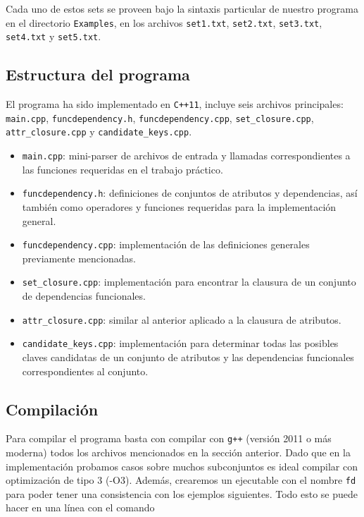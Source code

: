 \documentclass{article}
\begin{document}
Cada uno de estos sets se proveen bajo la sintaxis particular de nuestro programa en el directorio \verb|Examples|, en los archivos \verb|set1.txt|, \verb|set2.txt|, \verb|set3.txt|, \verb|set4.txt| y \verb|set5.txt|.

\subsection{Estructura del programa}
El programa ha sido implementado en \verb|C++11|, incluye seis archivos principales: \verb|main.cpp|, \verb|funcdependency.h|, \verb|funcdependency.cpp|, \verb|set_closure.cpp|, \verb|attr_closure.cpp| y \verb|candidate_keys.cpp|.

\begin{itemize}
    \item \verb|main.cpp|: mini-parser de archivos de entrada y llamadas correspondientes
    a las funciones requeridas en el trabajo práctico.
    \item \verb|funcdependency.h|: definiciones de conjuntos de atributos y dependencias, así también como operadores y funciones requeridas para la implementación general.
    \item \verb|funcdependency.cpp|: implementación de las definiciones generales previamente mencionadas.
    \item \verb|set_closure.cpp|: implementación para encontrar la clausura de un conjunto de dependencias funcionales.
    \item \verb|attr_closure.cpp|: similar al anterior aplicado a la clausura de atributos.
    \item \verb|candidate_keys.cpp|: implementación para determinar todas las posibles claves candidatas de un conjunto de atributos y las dependencias funcionales correspondientes al conjunto.
\end{itemize}

\subsection{Compilación}
Para compilar el programa basta con compilar con \texttt{g++} (versión 2011 o más moderna) todos los archivos mencionados en la sección anterior. Dado que en la implementación probamos casos sobre muchos subconjuntos es ideal compilar con optimización de tipo 3 (-O3). Además, crearemos un ejecutable con el nombre \verb|fd| para poder tener una consistencia con los ejemplos siguientes. Todo esto se puede hacer en una línea con el comando
\end{document}
